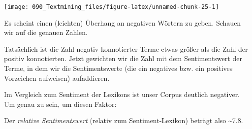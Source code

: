 \documentclass[12pt,]{book}
\makeatletter
\newenvironment{Shaded}{\begin{snugshade}}{\end{snugshade}}
\newcommand{\KeywordTok}[1]{\textcolor[rgb]{0.13,0.29,0.53}{\textbf{{#1}}}}
\newcommand{\DataTypeTok}[1]{\textcolor[rgb]{0.13,0.29,0.53}{{#1}}}
\newcommand{\StringTok}[1]{\textcolor[rgb]{0.31,0.60,0.02}{{#1}}}
\newcommand{\CommentTok}[1]{\textcolor[rgb]{0.56,0.35,0.01}{\textit{{#1}}}}
\newcommand{\NormalTok}[1]{{#1}}
\newenvironment{kframe}{%
\medskip{}
\setlength{\fboxsep}{.8em}
 \def\at@end@of@kframe{}%
 \ifinner\ifhmode%
  \def\at@end@of@kframe{\end{minipage}}%
  \begin{minipage}{\columnwidth}%
 \fi\fi%
 \def\FrameCommand##1{\hskip\@totalleftmargin \hskip-\fboxsep
 \colorbox{shadecolor}{##1}\hskip-\fboxsep
     \hskip-\linewidth \hskip-\@totalleftmargin \hskip\columnwidth}%
 \MakeFramed {\advance\hsize-\width
   \@totalleftmargin\z@ \linewidth\hsize
   \@setminipage}}%
 {\par\unskip\endMakeFramed%
 \at@end@of@kframe}
\renewenvironment{Shaded}{\begin{kframe}}{\end{kframe}}
\makeatother
\begin{document}
\begin{center}\texttt{[image: 090\_Textmining\_files/figure-latex/unnamed-chunk-25-1]} \end{center}

Es scheint einen (leichten) Überhang an negativen Wörtern zu geben.
Schauen wir auf die genauen Zahlen.

\begin{Shaded}
\end{Shaded}

Tatsächlich ist die Zahl negativ konnotierter Terme etwas größer als die
Zahl der positiv konnotierten. Jetzt gewichten wir die Zahl mit dem
Sentimentswert der Terme, in dem wir die Sentimentswerte (die ein
negatives bzw. ein positives Vorzeichen aufweisen) aufaddieren.

\begin{Shaded}
\end{Shaded}

Im Vergleich zum Sentiment der Lexikons ist unser Corpus deutlich
negativer. Um genau zu sein, um diesen Faktor:

\begin{Shaded}
\end{Shaded}

Der \emph{relative Sentimentswert} (relativ zum Sentiment-Lexikon)
beträgt also \textasciitilde{}7.8.
\end{document}
